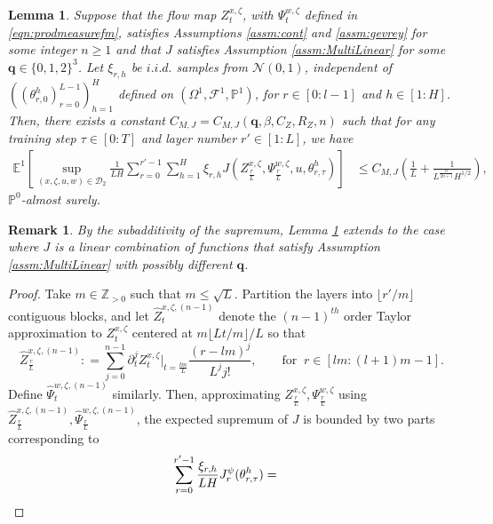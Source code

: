 \documentclass{article}
\newtheorem{lemma}[theorem]{Lemma}
\newtheorem{remark}[theorem]{Remark}
\begin{document}
\begin{appendices}
\begin{lemma}\label{lemma:TaylorApproxE}
Suppose that the flow map $Z_t^{x,\zeta}$, with $ \Psi_t^{w,\zeta}$ defined in \eqref{eqn:prodmeasurefm}, satisfies Assumptions \ref{assm:cont} and \ref{assm:gevrey} for some integer $n\ge 1$ and that $J$ satisfies Assumption \ref{assm:MultiLinear} for some $\bm q\in\{0,1,2\}^3$.
Let $\xi_{r,h}$ be $i.i.d.$ samples from $\mathcal N(0,1)$, independent of $((\theta^h_{r,0})_{r=0}^{L-1})_{h=1}^H$ defined on $(\Omega^1,\mathcal F^1,\mathbb P^1)$, for $r \in[0:l-1]$ and $h \in[1:H]$. Then, there exists a constant $C_{M,J}= C_{M,J}(\bm q,\beta,C_Z,R_Z,n)$ such that for any training step $\tau \in[0:T]$ and layer number $r'\in[1:L]$, we have
    \begin{align}
        \mathbb E^1\left[ \sup_{(x,\zeta,u,w)\in\mathscr D_2}\frac{1}{LH}\sum_{r=0}^{r'-1}\sum_{h=1}^H \xi_{r,h} J(Z^{x,\zeta}_\frac{r}{L}, \Psi^{w,\zeta}_\frac{r}{L} ,u, \theta^h_{r,\tau})\right]&\le C_{M,J}\left(\frac{1}{L}+ \frac{1}{L^{\frac{n}{2n+1}}H^{1/2}} \right),\label{eqn:EsupMathcalJ}
    \end{align}
$\mathbb P^0$-almost surely. 
\end{lemma}
\begin{remark}\label{remark:subadditivity}
By the subadditivity of the supremum, Lemma \ref{lemma:TaylorApproxE} extends to the case where $J$ is a linear combination of functions that satisfy Assumption \ref{assm:MultiLinear} with possibly different $\bm{q}$.
\end{remark}
\begin{proof}
Take $m\in \mathbb Z_{>0}$ such that $m\le \sqrt{L}$.
 Partition the layers into $\lfloor r'/m\rfloor$ contiguous blocks, and let $\hat Z^{x,\zeta,(n-1)}_t$ denote the $(n-1)^{th}$ order Taylor approximation to $Z^{x,\zeta}_t$ centered at $m\lfloor Lt/m\rfloor/L$ so that
\begin{equation}\label{eqn:TaylowApprox}
    \hat Z^{x,\zeta,(n-1)}_\frac{r}{L}: =  \sum_{j=0}^{n-1}\partial_t^j Z^{x,\zeta}_t\big|_{t=\frac{lm}{L}}\frac{(r-lm)^j}{L^jj!}, \qquad  \text{for}\;\;r \in [lm:(l+1)m-1].
\end{equation}
Define $\hat \Psi^{w,\zeta,(n-1)}_t$ similarly.
Then, approximating $Z^{x,\zeta}_\frac{r}{L}, \Psi^{w,\zeta}_\frac{r}{L}$ using $ \hat Z^{x,\zeta,(n-1)}_{\frac{r}{L}}, \hat \Psi^{w,\zeta,(n-1)}_{\frac{r}{L}}$, the expected supremum of $J$ is bounded by two parts corresponding to 
\begin{align}  \sum_{r=0}^{r'-1}\frac{\xi_{r,h}}{LH}J^{\psi}_r(\theta^h_{r,\tau})\notag&=

\end{align}
\end{proof}
\end{appendices}
\end{document}
